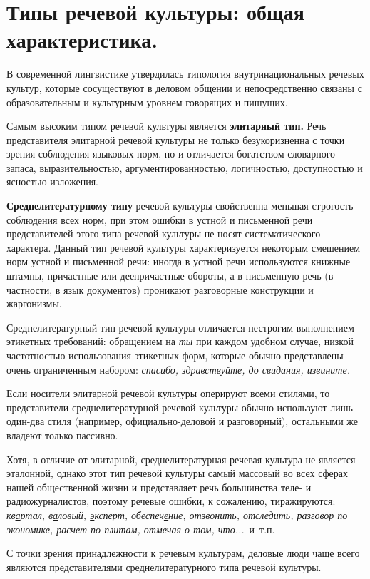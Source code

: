 \section{Типы речевой культуры: общая характеристика.}

В современной лингвистике утвердилась типология внутринациональных речевых культур, которые сосуществуют в деловом общении и непосредственно связаны с образовательным и культурным уровнем говорящих и пишущих.

Самым высоким типом речевой культуры является \textbf{элитарный тип.}
Речь представителя элитарной речевой культуры не только безукоризненна с точки зрения соблюдения языковых норм, но и отличается богатством словарного запаса, выразительностью, аргументированностью, логичностью, доступностью и ясностью изложения.

\textbf{Среднелитературному типу} речевой культуры свойственна меньшая строгость соблюдения всех норм, при этом ошибки в устной и письменной речи представителей этого типа речевой культуры не носят систематического характера.
Данный тип речевой культуры характеризуется некоторым смешением норм устной и письменной речи: иногда в устной речи используются книжные штампы, причастные или деепричастные обороты, а в письменную речь (в частности, в язык документов) проникают разговорные конструкции и жаргонизмы.

Среднелитературный тип речевой культуры отличается нестрогим выполнением этикетных требований: обращением на \textit{ты} при каждом удобном случае, низкой частотностью использования этикетных форм, которые обычно представлены очень ограниченным набором: \textit{спасибо, здравствуйте, до свидания, извините.}

Если носители элитарной речевой культуры оперируют всеми стилями, то представители среднелитературной речевой культуры обычно используют лишь один-два стиля (например, официально-деловой и разговорный), остальными же владеют только пассивно.

Хотя, в отличие от элитарной, среднелитературная речевая культура не является эталонной, однако этот тип речевой культуры самый массовый во всех сферах нашей общественной жизни и представляет речь большинства теле- и радиожурналистов, поэтому речевые ошибки, к сожалению, тиражируются: \textit{кв\underline{а}ртал, в\underline{а}ловый, \underline{э}ксперт, обеспеч\underline{е}ние, отзвонить, отследить, разговор по экономике, расчет по плитам, отмечая о том, что...}~и~т.п.

С точки зрения принадлежности к речевым культурам, деловые люди чаще всего являются представителями среднелитературного типа речевой культуры.

